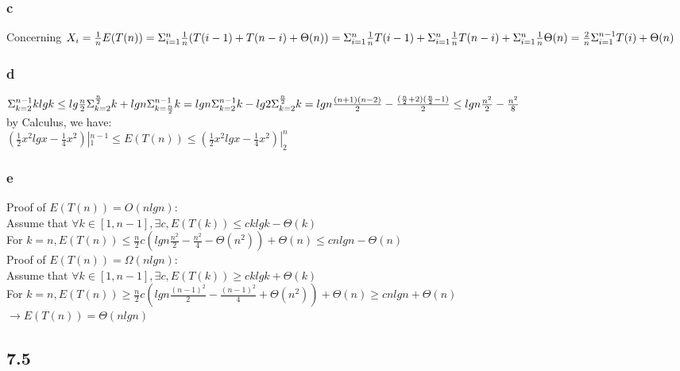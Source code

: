 \documentclass[]{article}
\begin{document}
\subsubsection{c}
Concerning $X_{i} = \frac{1}{n}\\
E(T(n)) = \Sigma_{i=1}^{n}\frac{1}{n}(T(i-1) + T(n-i) + \Theta(n))\\
= \Sigma_{i=1}^{n}\frac{1}{n}T(i-1) + \Sigma_{i=1}^{n}\frac{1}{n}T(n-i) + \Sigma_{i=1}^{n}\frac{1}{n}\Theta(n)\\
= \frac{2}{n}\Sigma_{i=1}^{n-1}T(i) + \Theta(n)$

\subsubsection{d}
$\Sigma_{k=2}^{n-1}klgk \\
\le lg\frac{n}{2}\Sigma_{k=2}^{\frac{n}{2}}k + lgn\Sigma_{k=\frac{n}{2}}^{n-1}k\\
= lgn\Sigma_{k=2}^{n-1}k - lg2\Sigma_{k=2}^{\frac{n}{2}}k\\
= lgn\frac{(n+1)(n-2)}{2} - \frac{(\frac{n}{2} + 2)(\frac{n}{2}-1)}{2}\\
\le lgn\frac{n^2}{2} - \frac{n^2}{8}$\\
by Calculus, we have:\\
$(\frac{1}{2}x^2lgx - \frac{1}{4}x^2)|_{1}^{n-1} \le E(T(n)) \le (\frac{1}{2}x^2lgx - \frac{1}{4}x^2)|_{2}^{n}$

\subsubsection{e}
Proof of $E(T(n)) = O(nlgn)$:\\
Assume that $\forall k \in [1, n-1], \exists c, E(T(k)) \le cklgk - \Theta(k)$\\
For $k = n, E(T(n)) \le \frac{n}{2}c(lgn\frac{n^2}{2} - \frac{n^2}{4} - \Theta (n^2)) + \Theta(n) \le cnlgn - \Theta(n) $\\
Proof of $E(T(n)) =\Omega(nlgn)$:\\
Assume that $\forall k \in [1, n-1], \exists c, E(T(k)) \ge cklgk + \Theta(k)$\\
For $k = n, E(T(n)) \ge \frac{n}{2}c(lgn\frac{(n-1)^2}{2} - \frac{(n-1)^2}{4} + \Theta(n^2)) + \Theta(n) \ge cnlgn + \Theta(n)$\\
$\rightarrow E(T(n)) = \Theta(nlgn)$

\subsection{7.5}
\end{document}
